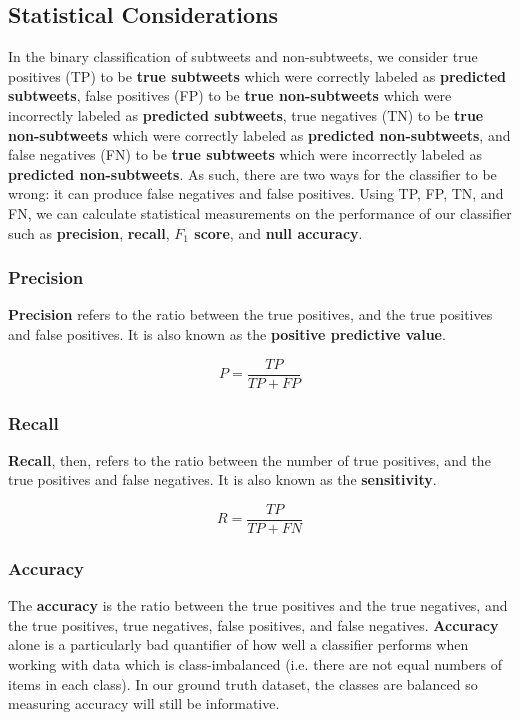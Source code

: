 \documentclass[11pt, twoside, reqno]{book}
\begin{document}
\subsection{Statistical Considerations}
\label{statistical_considerations}

In the binary classification of subtweets and non-subtweets, we consider true positives (TP) to be \textbf{true subtweets} which were correctly labeled as \textbf{predicted subtweets}, false positives (FP) to be \textbf{true non-subtweets} which were incorrectly labeled as \textbf{predicted subtweets}, true negatives (TN) to be \textbf{true non-subtweets} which were correctly labeled as \textbf{predicted non-subtweets}, and false negatives (FN) to be \textbf{true subtweets} which were incorrectly labeled as \textbf{predicted non-subtweets}. As such, there are two ways for the classifier to be wrong: it can produce false negatives and false positives. Using TP, FP, TN, and FN, we can calculate statistical measurements on the performance of our classifier such as \textbf{precision}, \textbf{recall}, \textbf{$F_{1}$ score}, and \textbf{null accuracy}.

\subsubsection{Precision}
\label{precision}

\textbf{Precision} refers to the ratio between the true positives, and the true positives and false positives. It is also known as the \textbf{positive predictive value}.

\[P=\frac{TP}{TP+FP}\] 

\subsubsection{Recall}
\label{recall}

\textbf{Recall}, then, refers to the ratio between the number of true positives, and the true positives and false negatives. It is also known as the \textbf{sensitivity}.

\[R=\frac{TP}{TP+FN}\] 

\subsubsection{Accuracy}
\label{accuracy}

The \textbf{accuracy} is the ratio between the true positives and the true negatives, and the true positives, true negatives, false positives, and false negatives. \textbf{Accuracy} alone is a particularly bad quantifier of how well a classifier performs when working with data which is class-imbalanced (i.e. there are not equal numbers of items in each class). In our ground truth dataset, the classes are balanced so measuring accuracy will still be informative.
\end{document}
